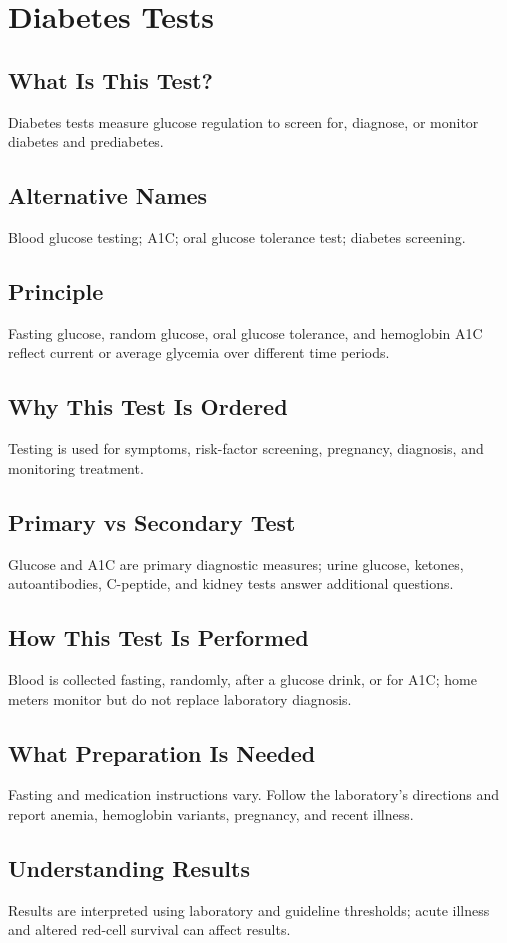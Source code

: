 \chapter{Diabetes Tests}
\section*{What Is This Test?} Diabetes tests measure glucose regulation to screen for, diagnose, or monitor diabetes and prediabetes.
\section*{Alternative Names} Blood glucose testing; A1C; oral glucose tolerance test; diabetes screening.
\section*{Principle} Fasting glucose, random glucose, oral glucose tolerance, and hemoglobin A1C reflect current or average glycemia over different time periods.
\section*{Why This Test Is Ordered} Testing is used for symptoms, risk-factor screening, pregnancy, diagnosis, and monitoring treatment.
\section*{Primary vs Secondary Test} Glucose and A1C are primary diagnostic measures; urine glucose, ketones, autoantibodies, C-peptide, and kidney tests answer additional questions.
\section*{How This Test Is Performed} Blood is collected fasting, randomly, after a glucose drink, or for A1C; home meters monitor but do not replace laboratory diagnosis.
\section*{What Preparation Is Needed} Fasting and medication instructions vary. Follow the laboratory's directions and report anemia, hemoglobin variants, pregnancy, and recent illness.
\section*{Understanding Results} Results are interpreted using laboratory and guideline thresholds; acute illness and altered red-cell survival can affect results.
